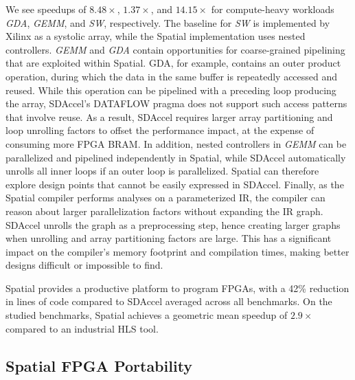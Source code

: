 We see speedups of $8.48\times$, $1.37\times$, and $14.15\times$ for compute-heavy workloads \emph{GDA}, \emph{GEMM}, and \emph{SW}, respectively. The baseline for \emph{SW} is implemented by Xilinx as a systolic array, while the Spatial implementation uses nested controllers. \emph{GEMM} and \emph{GDA} contain opportunities for coarse-grained pipelining that are exploited within Spatial.
GDA, for example, contains an outer product operation, during which the data in the same buffer is repeatedly accessed and reused. While this operation can be pipelined with a preceding loop producing the array, SDAccel's DATAFLOW pragma does not support such access patterns that involve reuse. As a result, SDAccel requires larger array partitioning and loop unrolling factors to offset the performance impact, at the expense of consuming more FPGA BRAM.
In addition, nested controllers in \emph{GEMM}
can be parallelized and pipelined independently in Spatial, while SDAccel automatically unrolls all inner loops if an outer loop is parallelized. Spatial can therefore explore
design points that cannot be easily expressed in SDAccel. Finally, as the Spatial compiler performs analyses on a parameterized IR, the compiler can reason about larger parallelization factors without expanding the IR graph.
SDAccel unrolls the graph as a preprocessing step, hence creating larger graphs when unrolling and array partitioning factors are large.
This has a significant impact on the compiler's memory footprint and compilation times, making better designs difficult or impossible to find.

Spatial provides a productive platform to program FPGAs, with a 42\% reduction in lines of code compared to SDAccel averaged across all benchmarks. On the studied benchmarks, Spatial achieves a geometric mean speedup of $2.9\times$ compared to an industrial HLS tool.


\subsection{Spatial FPGA Portability}

